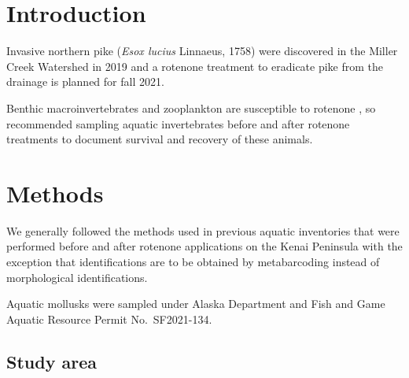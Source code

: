 \begin{multicols}{2}

\section{Introduction}

Invasive northern pike (\textit{Esox lucius} Linnaeus, 1758) were discovered in the Miller Creek Watershed in 2019 \citep{KNWR2021} and a rotenone treatment to eradicate pike from the drainage is planned for fall 2021.

Benthic macroinvertebrates and zooplankton are susceptible to rotenone \citep{Finlaysonetal2018}, so \citet{Finlaysonetal2018} recommended sampling aquatic invertebrates before and after rotenone treatments to document survival and recovery of these animals.


\section{Methods}

We generally followed the methods used in previous aquatic inventories that were performed before and after rotenone applications on the Kenai Peninsula \citep{Massengill2014, Massengill2017} with the exception that identifications are to be obtained by metabarcoding instead of morphological identifications.

Aquatic mollusks were sampled under Alaska Department and Fish and Game Aquatic Resource Permit No.\ SF2021-134.

\subsection{Study area}


\end{multicols}
